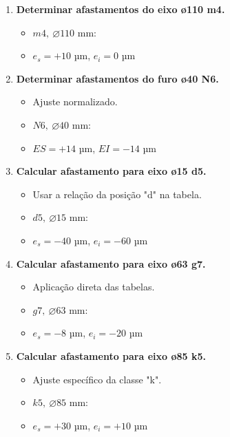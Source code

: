 \begin{enumerate}
    \item \textbf{Determinar afastamentos do eixo ø110 m4.}
    \begin{itemize}
        \item \( m4, \ \varnothing 110 \) mm:
        \item \( e_s = +10 \) µm, \( e_i = 0 \) µm
    \end{itemize}

    \item \textbf{Determinar afastamentos do furo ø40 N6.}
    \begin{itemize}
        \item Ajuste normalizado.
        \item \( N6, \ \varnothing 40 \) mm:
        \item \( ES = +14 \) µm, \( EI = -14 \) µm
    \end{itemize}

    \item \textbf{Calcular afastamento para eixo ø15 d5.}
    \begin{itemize}
        \item Usar a relação da posição "d" na tabela.
        \item \( d5, \ \varnothing 15 \) mm:
        \item \( e_s = -40 \) µm, \( e_i = -60 \) µm
    \end{itemize}

    \item \textbf{Calcular afastamento para eixo ø63 g7.}
    \begin{itemize}
        \item Aplicação direta das tabelas.
        \item \( g7, \ \varnothing 63 \) mm:
        \item \( e_s = -8 \) µm, \( e_i = -20 \) µm
    \end{itemize}

    \item \textbf{Calcular afastamento para eixo ø85 k5.}
    \begin{itemize}
        \item Ajuste específico da classe "k".
        \item \( k5, \ \varnothing 85 \) mm:
        \item \( e_s = +30 \) µm, \( e_i = +10 \) µm
    \end{itemize}
\end{enumerate}
